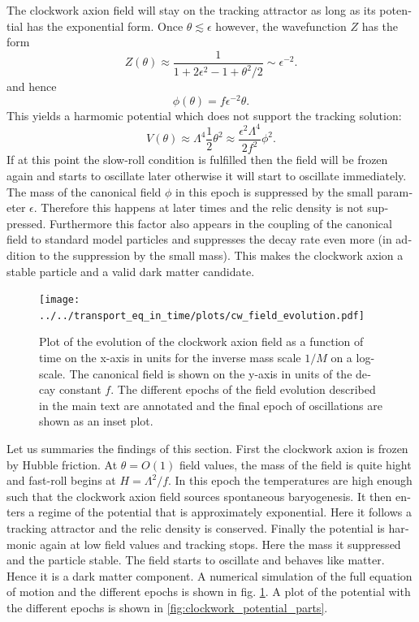 \documentclass[master,       %
               twoside,        %
               BCOR10mm,       %
               english,ngerman, %
               ]{GAUBM}
\begin{document}
\begin{otherlanguage}{english}
The clockwork axion field will stay on the tracking attractor as long as its potential has the exponential form.
Once $\theta \lesssim \epsilon$ however, the wavefunction $Z$ has the form
\begin{equation}
	Z(\theta) \approx \frac{1}{1 + 2\epsilon^2 - 1 + \theta^2/2} \sim \epsilon^{-2}.
\end{equation}
and hence
\begin{equation}
	\label{eq:small_field_value_relation}
	\phi(\theta) = f \epsilon^{-2} \theta.
\end{equation}
This yields a harmomic potential which does not support the tracking solution:
\begin{equation}
	V(\theta) \approx \Lambda^4 \frac{1}{2} \theta^2 \approx \frac{\epsilon^2 \Lambda^4}{2 f^2} \phi^2.
\end{equation}
If at this point the slow-roll condition is fulfilled then the field will be frozen again and starts to oscillate later otherwise it will start to oscillate immediately.
The mass of the canonical field $\phi$ in this epoch is suppressed by the small parameter $\epsilon$. Therefore this happens at later times and the relic density is not suppressed.
Furthermore this factor also appears in the coupling of the canonical field to standard model particles and suppresses the decay rate even more (in addition to the suppression by the small mass). This makes the clockwork axion a stable particle and a valid dark matter candidate.

\begin{figure}[H]
	\texttt{[image: ../../transport\_eq\_in\_time/plots/cw\_field\_evolution.pdf]}
	\caption{Plot of the evolution of the clockwork axion field as a function of time on the x-axis in units for the inverse mass scale $1/M$ on a log-scale. The canonical field is shown on the y-axis in units of the decay constant $f$. The different epochs of the field evolution described in the main text are annotated and the final epoch of oscillations are shown as an inset plot.}
	\label{fig:evolution_of_clockwork_axion_field}
\end{figure}

Let us summaries the findings of this section.
First the clockwork axion is frozen by Hubble friction. At $\theta = O(1)$ field values, the mass of the field is quite hight and fast-roll begins at $H = \Lambda^2 / f$. In this epoch the temperatures are high enough such that the clockwork axion field sources spontaneous baryogenesis.
It then enters a regime of the potential that is approximately exponential.
Here it follows a tracking attractor and the relic density is conserved.
Finally the potential is harmonic again at low field values and tracking stops.
Here the mass it suppressed and the particle stable.
The field starts to oscillate and behaves like matter. Hence it is a dark matter component. A numerical simulation of the full equation of motion and the different epochs is shown in fig. \ref{fig:evolution_of_clockwork_axion_field}. A plot of the potential with the different epochs is shown in \ref{fig:clockwork_potential_parts}.


\end{otherlanguage}
\end{document}
